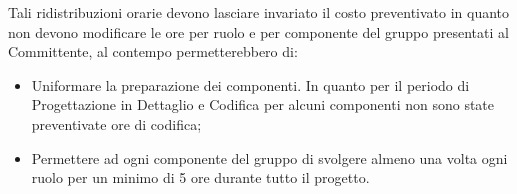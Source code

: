 %
Tali ridistribuzioni orarie devono lasciare invariato il costo preventivato in quanto non devono modificare le ore per ruolo e per componente del gruppo presentati al Committente, al contempo permetterebbero di:
\begin{itemize}
	\item Uniformare la preparazione dei componenti. In quanto per il periodo di Progettazione in Dettaglio e Codifica per alcuni componenti non sono state preventivate ore di codifica;
	\item Permettere ad ogni componente del gruppo di svolgere almeno una volta ogni ruolo per un minimo di 5 ore durante tutto il progetto. 	
\end{itemize}
